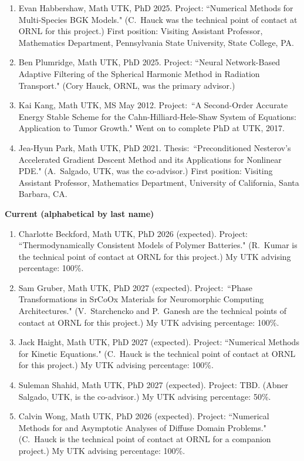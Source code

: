 \documentclass[11pt]{letter}
\begin{document}
\begin{description}
\begin{enumerate}
Zhen Guan, Math UTK, PhD August 2012.  Thesis:~``Numerical Analysis of First and Second Order Unconditionally Energy Stable Schemes for Nonlocal Cahn-Hilliard and Allen-Cahn Equations." First position: Visiting Assistant Professor, Mathematics Department, University of California, Irvine, CA.
	\item
Evan Habbershaw, Math UTK, PhD 2025. Project: ``Numerical Methods for Multi-Species BGK Models." (C.~Hauck was the technical point of contact at ORNL for this project.) First position: Visiting Assistant Professor, Mathematics Department, Pennsylvania State University, State College, PA.
	\item
Ben Plumridge, Math UTK, PhD 2025. Project: ``Neural Network-Based Adaptive Filtering of the Spherical Harmonic Method in Radiation Transport." (Cory Hauck, ORNL, was the primary advisor.) 

	\item
Kai Kang, Math UTK, MS May 2012.  Project:~``A Second-Order Accurate Energy Stable Scheme for the Cahn-Hilliard-Hele-Shaw System of Equations: Application to Tumor Growth." Went on to complete PhD at UTK, 2017.

	\item
Jea-Hyun Park, Math UTK, PhD 2021.  Thesis:~``Preconditioned Nesterov's Accelerated Gradient Descent Method and its Applications for Nonlinear PDE." (A.~Salgado, UTK, was the co-advisor.) First position: Visiting Assistant Professor,  Mathematics Department, University of California, Santa Barbara, CA. 
	\end{enumerate}
	\item
{\Large\bf Current (alphabetical by last name)}
	\begin{enumerate}
	\item
Charlotte Beckford, Math UTK, PhD 2026 (expected). Project: ``Thermodynamically Consistent Models of Polymer Batteries." (R.~Kumar is the technical point of contact at ORNL for this project.) My UTK advising percentage: 100\%.
	\item
Sam Gruber, Math UTK, PhD 2027 (expected).  Project:~``Phase Transformations in SrCoOx Materials for Neuromorphic Computing Architectures." (V.~Starchencko and P.~Ganesh are the technical points of contact at ORNL for this project.) My UTK advising percentage: 100\%.
	\item
Jack Haight, Math UTK, PhD 2027 (expected). Project: ``Numerical Methods for Kinetic Equations." (C.~Hauck is the technical point of contact at ORNL for this project.) My UTK advising percentage: 100\%.
	\item
Suleman Shahid, Math UTK, PhD 2027 (expected). Project: TBD. (Abner Salgado, UTK, is the co-advisor.) My UTK advising percentage: 50\%.
	\item
Calvin Wong, Math UTK, PhD 2026 (expected). Project: ``Numerical Methods for and Asymptotic Analyses of Diffuse Domain Problems." (C.~Hauck is the technical point of contact at ORNL for a companion project.) My UTK advising percentage: 100\%.
	\end{enumerate}

	\end{description}
	
\end{document}
